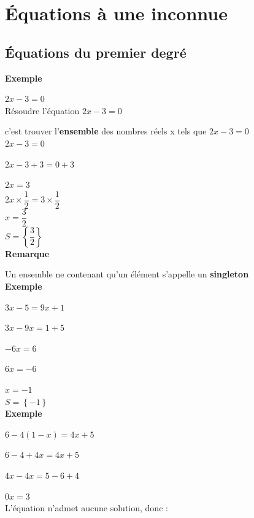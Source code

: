 

\section{Équations à une inconnue}

\subsection{Équations du premier degré}

\textbf{Exemple }

$ 2x - 3 = 0 $ \\

Résoudre l'équation $ 2x-3=0$

c'est trouver l'\textbf{ensemble} des nombres réels x tels que $2x-3=0$ \\

$ 2x-3=0$

$ 2x-3+3 = 0+3$ 

$2x=3$ \\

$ 2x \times \dfrac{1}{2} = 3 \times \dfrac{1}{2} $ \\

$ x = \dfrac{3}{2} $ \\

$ S = \left\lbrace\dfrac{3}{2}\right\rbrace $ \\

\textbf{Remarque}

Un ensemble ne contenant qu'un élément s'appelle un \textbf{singleton} \\

\textbf{Exemple }

$ 3x-5=9x+1 $

$ 3x-9x=1+5 $

$-6x=6 $

$6x=-6 $

$x = -1 $ \\

$ S = \left\lbrace-1\right\rbrace $ \\

\textbf{Exemple }

$ 6-4\left(1-x\right) = 4x+5 $

$ 6 - 4 + 4x = 4x + 5 $

$ 4x - 4x = 5 -6 + 4 $

$ 0x = 3  $ \\

L'équation n'admet aucune solution, donc : 

